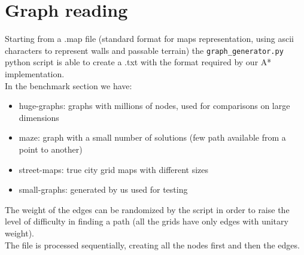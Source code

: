 \section{Graph reading}
\label{Sec:reading}

Starting from a .map file (standard format for maps representation, using ascii characters to represent walls and passable terrain)
the \verb|graph_generator.py| python script is able to create a .txt with the format required by our A* implementation. \\
In the benchmark section we have:
\begin{itemize}
	\item huge-graphs: graphs with millions of nodes, used for comparisons on large dimensions
	\item maze: graph with a small number of solutions (few path available from a point to another)
	\item street-maps: true city grid maps with different sizes
	\item small-graphs: generated by us used for testing
\end{itemize}
The weight of the edges can be randomized by the script in order to raise the level of difficulty in finding a path (all the grids have only edges with unitary weight).
\\
The file is processed sequentially, creating all the nodes first and then the edges.
